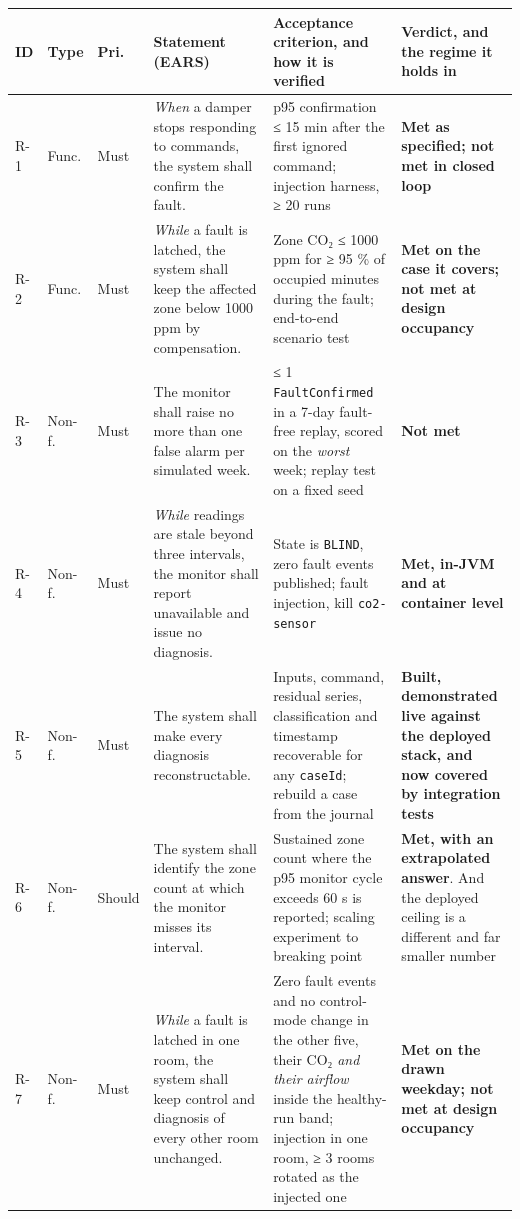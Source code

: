 \begin{longtable}[]{@{}
  >{\raggedright\arraybackslash}p{}
  >{\raggedright\arraybackslash}p{}
  >{\raggedright\arraybackslash}p{}
  >{\raggedright\arraybackslash}p{}
  >{\raggedright\arraybackslash}p{}
  >{\raggedright\arraybackslash}p{}@{}}
\toprule
\textbf{ID} & \textbf{Type} & \textbf{Pri.} & \textbf{Statement (EARS)} & \textbf{Acceptance
criterion, and how it is verified} & \textbf{Verdict, and the regime it holds in} \\
\midrule
\endhead
R-1 & Func. & Must & \emph{When} a damper stops responding to commands, the system shall confirm the fault. &
p95 confirmation ≤ 15 min after the first ignored command; injection harness, ≥ 20 runs &
\textbf{Met as specified; not met in closed loop} \\*
R-2 & Func. & Must & \emph{While} a fault is latched, the system shall keep the affected zone below 1000 ppm by
compensation. & Zone CO₂ ≤ 1000 ppm for ≥ 95 \% of occupied minutes during the fault; end-to-end
scenario test & \textbf{Met on the case it covers; not met at design occupancy} \\*
R-3 & Non-f. & Must & The monitor shall raise no more than one false alarm per simulated week. & ≤ 1
\texttt{FaultConfirmed} in a 7-day fault-free replay, scored on the \emph{worst} week; replay test
on a fixed seed & \textbf{Not met} \\*
R-4 & Non-f. & Must & \emph{While} readings are stale beyond three intervals, the monitor shall report unavailable
and issue no diagnosis. & State is \texttt{BLIND}, zero fault events published; fault injection,
kill \texttt{co2-sensor} & \textbf{Met, in-JVM and at container level} \\*
R-5 & Non-f. & Must & The system shall make every diagnosis reconstructable. & Inputs, command, residual series,
classification and timestamp recoverable for any \texttt{caseId}; rebuild a case from the journal &
\textbf{Built, demonstrated live against the deployed stack, and now covered by integration
tests} \\*
R-6 & Non-f. & Should & The system shall identify the zone count at which the monitor misses its interval. &
Sustained zone count where the p95 monitor cycle exceeds 60 s is reported; scaling experiment to
breaking point & \textbf{Met, with an extrapolated answer}. And the deployed ceiling is a
different and far smaller number \\*
R-7 & Non-f. & Must & \emph{While} a fault is latched in one room, the system shall keep control and diagnosis of
every other room unchanged. & Zero fault events and no control-mode change in the other five, their
CO₂ \emph{and their airflow} inside the healthy-run band; injection in one room, ≥ 3 rooms rotated
as the injected one & \textbf{Met on the drawn weekday; not met at design occupancy} \\
\bottomrule
\end{longtable}

